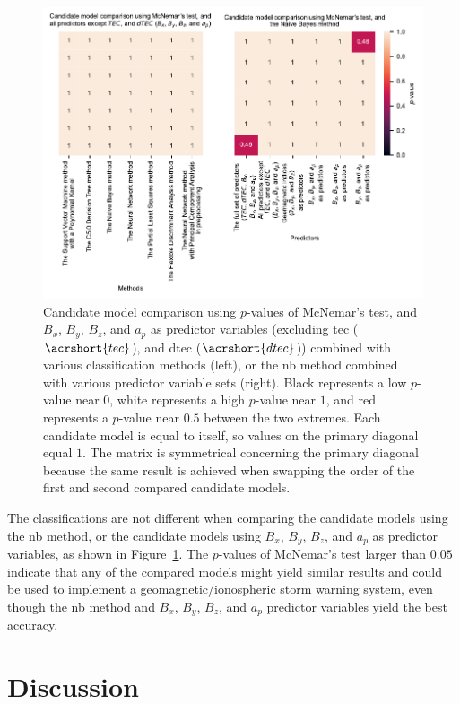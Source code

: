 \let\LaTeXcline\cline\documentclass[sn-mathphys-num]{sn-jnl}\let\cline\LaTeXcline
\begin{document}
\begin{figure}[!ht]
 \centering
    \includegraphics[width=\linewidth]{pvalueplot_total_horizontal.pdf}
    \caption{Candidate model comparison using $p$-values of McNemar's test, and $B_{x}$, $B_{y}$, $B_{z}$, and $a_{p}$ as predictor variables (excluding \acrlong{tec} ($\acrshort{tec}$), and \acrlong{dtec} ($\acrshort{dtec}$)) combined with various classification methods (left), or the \acrfull{nb} method combined with various predictor variable sets (right). Black represents a low $p$-value near $0$, white represents a high $p$-value near $1$, and red represents a $p$-value near $0.5$ between the two extremes. Each candidate model is equal to itself, so values on the primary diagonal equal $1$. The matrix is symmetrical concerning the primary diagonal because the same result is achieved when swapping the order of the first and second compared candidate models.}
    \label{fig:pvalueplot}
\end{figure}

The classifications are not different when comparing the candidate models using the \acrshort{nb} method, or the candidate models using $B_{x}$, $B_{y}$, $B_{z}$, and $a_{p}$ as predictor variables, as shown in Figure~\ref{fig:pvalueplot}. The $p$-values of McNemar's test larger than $0.05$ indicate that any of the compared models might yield similar results and could be used to implement a geomagnetic/ionospheric storm warning system, even though the \acrshort{nb} method and $B_{x}$, $B_{y}$, $B_{z}$, and $a_{p}$  predictor variables yield the best accuracy.

\section{Discussion}
\label{sec:Discussion}
\end{document}
